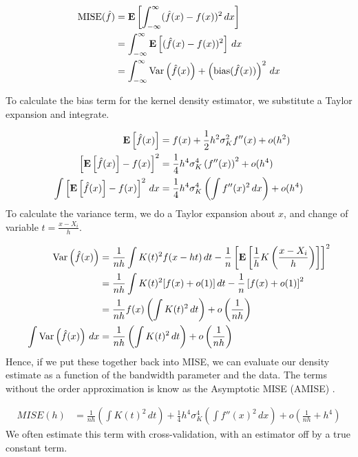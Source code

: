 \documentclass[12pt]{article}
\begin{document}
\begin{equation} \label{mise}
\begin{split}
\mathrm{MISE}(\hat{f}) &= \mathbf{E}\left[ \int_{-\infty}^{\infty}(\hat{f}(x) - f(x))^2 \, dx \right] \\
&= \int_{-\infty}^{\infty}\mathbf{E}\left[ (\hat{f}(x) - f(x))^2 \right] \, dx \\
&= \int_{-\infty}^{\infty} \mathrm{Var}\left( \hat{f}(x) \right) + \left(\mathrm{bias}(\hat{f}(x))\right)^2 \, dx
\end{split}
\end{equation}

To calculate the bias term for the kernel density estimator, we
substitute a Taylor expansion and integrate.

\[
\begin{aligned}
\mathbf{E}\left[ \hat{f}(x) \right] &= f(x) + \frac{1}{2}h^2\sigma^2_Kf''(x) + o(h^2) \\
\left[\mathbf{E}\left[ \hat{f}(x) \right] - f(x)\right]^2 &= \frac{1}{4}h^4\sigma^4_K\left(f''(x)\right)^2 + o(h^4) \\
\int \left[\mathbf{E}\left[ \hat{f}(x) \right] - f(x)\right]^2 \, dx &= \frac{1}{4}h^4\sigma^4_K\left(\int f''(x)^2 \, dx\right) + o(h^4) 
\end{aligned}
\] To calculate the variance term, we do a Taylor expansion about \(x\),
and change of variable \(t = \frac{x-X_i}{h}\).

\[
\begin{aligned}
\mathrm{Var}\left( \hat{f}(x) \right) &= \frac{1}{nh}\int K(t)^2f(x-ht)\, dt - \frac{1}{n}\left[\mathbf{E}\left[  \frac{1}{h} K\left( \frac{x-X_i}{h}\right) \right]\right]^2 \\
&= \frac{1}{nh}\int K(t)^2[f(x) + o(1)] \, dt - \frac{1}{n}\left[f(x) + o(1)\right]^2\\
&= \frac{1}{nh}f(x) \left(\int K(t)^2\, dt\right) + o\left( \frac{1}{nh}\right) \\
\int \mathrm{Var}\left( \hat{f}(x) \right) \, dx &= \frac{1}{nh}\left(\int K(t)^2\, dt\right) + o\left( \frac{1}{nh}\right)
\end{aligned}
\] Hence, if we put these together back into MISE, we can evaluate our
density estimate as a function of the bandwidth parameter and the data.
The terms without the order approximation is know as the Asymptotic MISE
(AMISE) \citep{wasserman2006all}.

\[
\begin{aligned}
MISE(h) &= \frac{1}{nh}\left(\int K(t)^2\, dt\right) + \frac{1}{4}h^4\sigma^4_K\left(\int f''(x)^2 \, dx\right) + o \left( \frac{1}{nh} + h^4\right)
\end{aligned}
\] We often estimate this term with cross-validation, with an estimator
off by a true constant term.
\end{document}
